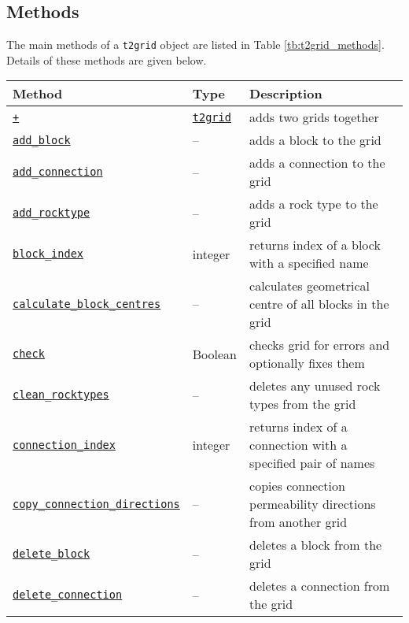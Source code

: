 \subsection{Methods}
\label{t2gridmethods}

The main methods of a \texttt{t2grid} object are listed in Table \ref{tb:t2grid_methods}.  Details of these methods are given below.

\begin{table}
  \begin{center}
    \begin{tabular}{|l|l|p{65mm}|}
      \hline
      \textbf{Method} & \textbf{Type} & \textbf{Description}\\
      \hline
      \hyperref[sec:t2grid:plus]{\texttt{+}} & \hyperref[t2grids]{\texttt{t2grid}} & adds two grids together\\
      \hyperref[sec:t2grid:add_block]{\texttt{add\_block}} & -- & adds a block to the grid\\
      \hyperref[sec:t2grid:add_connection]{\texttt{add\_connection}} & -- & adds a connection to the grid\\
      \hyperref[sec:t2grid:add_rocktype]{\texttt{add\_rocktype}} & -- & adds a rock type to the grid\\
      \hyperref[sec:t2grid:block_index]{\texttt{block\_index}} & integer & returns index of a block with a specified name\\
      \hyperref[sec:t2grid:calculate_block_centres]{\texttt{calculate\_block\_centres}} & -- & calculates geometrical centre of all blocks in the grid\\
      \hyperref[sec:t2grid:check]{\texttt{check}} & Boolean & checks grid for errors and optionally fixes them\\
      \hyperref[sec:t2grid:clean_rocktypes]{\texttt{clean\_rocktypes}} & -- & deletes any unused rock types from the grid\\
      \hyperref[sec:t2grid:connection_index]{\texttt{connection\_index}} & integer & returns index of a connection with a specified pair of names\\
      \hyperref[sec:t2grid:copy_connection_directions]{\texttt{copy\_connection\_directions}} & -- & copies connection permeability directions from another grid\\
      \hyperref[sec:t2grid:delete_block]{\texttt{delete\_block}} & -- & deletes a block from the grid\\
      \hyperref[sec:t2grid:delete_connection]{\texttt{delete\_connection}} & -- & deletes a connection from the grid\\

\end{tabular}
\end{center}
\end{table}
